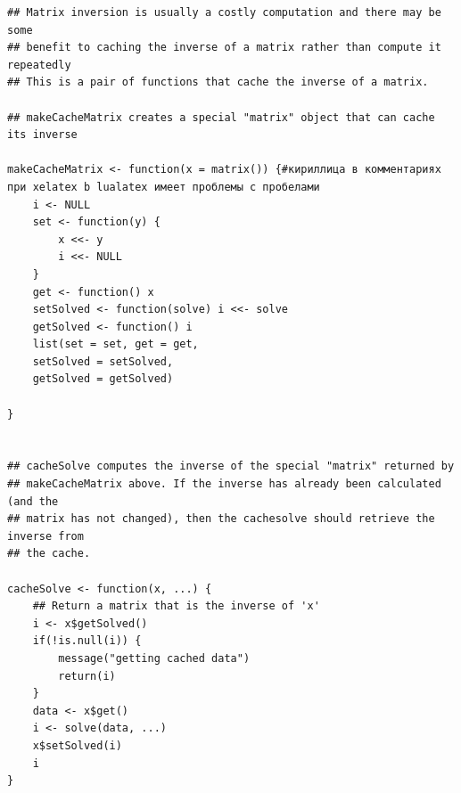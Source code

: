 {\begin{lstlisting}[language={Renhanced},caption={Пример листинга c подписью собственными средствами},label={list:internal3}]
## Matrix inversion is usually a costly computation and there may be some
## benefit to caching the inverse of a matrix rather than compute it repeatedly
## This is a pair of functions that cache the inverse of a matrix.

## makeCacheMatrix creates a special "matrix" object that can cache its inverse

makeCacheMatrix <- function(x = matrix()) {#кириллица в комментариях при xelatex b lualatex имеет проблемы с пробелами
    i <- NULL
    set <- function(y) {
        x <<- y
        i <<- NULL
    }
    get <- function() x
    setSolved <- function(solve) i <<- solve
    getSolved <- function() i
    list(set = set, get = get,
    setSolved = setSolved,
    getSolved = getSolved)
    
}


## cacheSolve computes the inverse of the special "matrix" returned by
## makeCacheMatrix above. If the inverse has already been calculated (and the
## matrix has not changed), then the cachesolve should retrieve the inverse from
## the cache.

cacheSolve <- function(x, ...) {
    ## Return a matrix that is the inverse of 'x'
    i <- x$getSolved()
    if(!is.null(i)) {
        message("getting cached data")
        return(i)
    }
    data <- x$get()
    i <- solve(data, ...)
    x$setSolved(i)
    i  
}
\end{lstlisting}
%
%    





}
